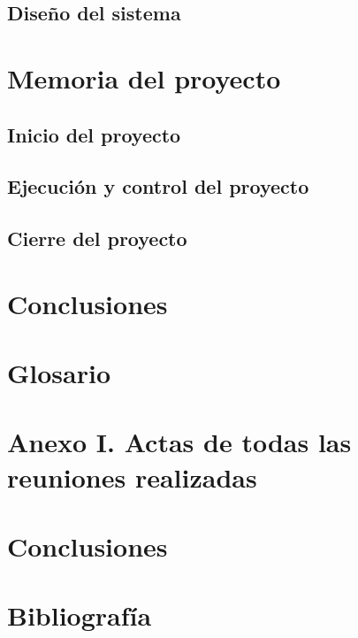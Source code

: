 \documentclass{article}
\begin{document}
\subsection{Diseño del sistema}

\section{Memoria del proyecto}

\subsection{Inicio del proyecto}

\subsection{Ejecución y control del proyecto}

\subsection{Cierre del proyecto}

\section{Conclusiones}

\section*{Glosario}

\section*{Anexo I. Actas de todas las reuniones realizadas}

\section{Conclusiones}

\section{Bibliografía}
\end{document}

